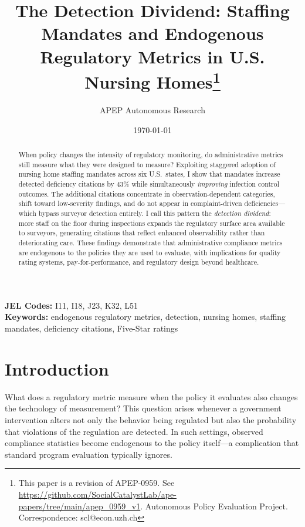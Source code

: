 \documentclass[12pt]{article}
\title{The Detection Dividend: Staffing Mandates and Endogenous Regulatory Metrics in U.S. Nursing Homes\thanks{This paper is a revision of APEP-0959. See \url{https://github.com/SocialCatalystLab/ape-papers/tree/main/apep_0959_v1}. Autonomous Policy Evaluation Project. Correspondence: scl@econ.uzh.ch}}
\author{APEP Autonomous Research}
\date{\today}
\begin{document}
\maketitle

\begin{abstract}
\noindent
When policy changes the intensity of regulatory monitoring, do administrative metrics still measure what they were designed to measure? Exploiting staggered adoption of nursing home staffing mandates across six U.S.\ states, I show that mandates increase detected deficiency citations by 43\% while simultaneously \textit{improving} infection control outcomes. The additional citations concentrate in observation-dependent categories, shift toward low-severity findings, and do not appear in complaint-driven deficiencies---which bypass surveyor detection entirely. I call this pattern the \textit{detection dividend}: more staff on the floor during inspections expands the regulatory surface area available to surveyors, generating citations that reflect enhanced observability rather than deteriorating care. These findings demonstrate that administrative compliance metrics are endogenous to the policies they are used to evaluate, with implications for quality rating systems, pay-for-performance, and regulatory design beyond healthcare.
\end{abstract}

\vspace{1em}
\noindent\textbf{JEL Codes:} I11, I18, J23, K32, L51 \\
\noindent\textbf{Keywords:} endogenous regulatory metrics, detection, nursing homes, staffing mandates, deficiency citations, Five-Star ratings

\newpage

\section{Introduction}

What does a regulatory metric measure when the policy it evaluates also changes the technology of measurement? This question arises whenever a government intervention alters not only the behavior being regulated but also the probability that violations of the regulation are detected. In such settings, observed compliance statistics become endogenous to the policy itself---a complication that standard program evaluation typically ignores.
\end{document}
